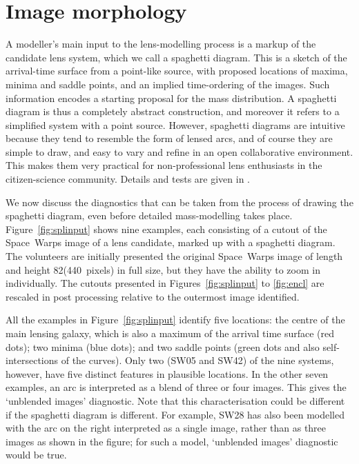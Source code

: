 
\section{Image morphology}
\label{sec:morph}

A modeller's main input to the lens-modelling process is a markup of
the candidate lens system, which we call a spaghetti diagram.
This is a sketch of the arrival-time surface from a point-like source,
with proposed locations of maxima, minima and saddle points, and an
implied time-ordering of the images.  Such information encodes a
starting proposal for the mass distribution.  A spaghetti diagram is
thus a completely abstract construction, and moreover it refers to a
simplified system with a point source.  However, spaghetti diagrams
are intuitive because they tend to resemble the form of lensed arcs,
and of course they are simple to draw, and easy to vary and refine in
an open collaborative environment.  This makes them very practical for
non-professional lens enthusiasts in the citizen-science community.
Details and tests are given in \cite{2015MNRAS.447.2170K}.

We now discuss the diagnostics that can be taken from the process of
drawing the spaghetti diagram, even before detailed mass-modelling
takes place.  Figure~\ref{fig:splinput} shows nine examples, each
consisting of a cutout of the Space~Warps image of a lens candidate,
marked up with a spaghetti diagram.
The volunteers are initially presented the original Space~Warps image of
length and height 82\arcsec (440~pixels) in full size, but they have the
ability to zoom in individually.
The cutouts presented in Figures~\ref{fig:splinput} to \ref{fig:encl}
are rescaled in post processing relative to the outermost image identified.

All the examples in Figure~\ref{fig:splinput} identify five locations:
the centre of the main lensing galaxy, which is also a maximum of the
arrival time surface (red dots); two minima (blue dots); and two
saddle points (green dots and also self-intersections of the curves).
Only two (SW05 and SW42) of the nine systems, however, have five
distinct features in plausible locations.  In the other seven
examples, an arc is interpreted as a blend of three or four images.
This gives the `unblended images' diagnostic.  Note that this
characterisation could be different if the spaghetti diagram is
different.  For example, SW28 has also been modelled with the arc on
the right interpreted as a single image, rather than as three images
as shown in the figure; for such a model, `unblended images'
diagnostic would be true.

